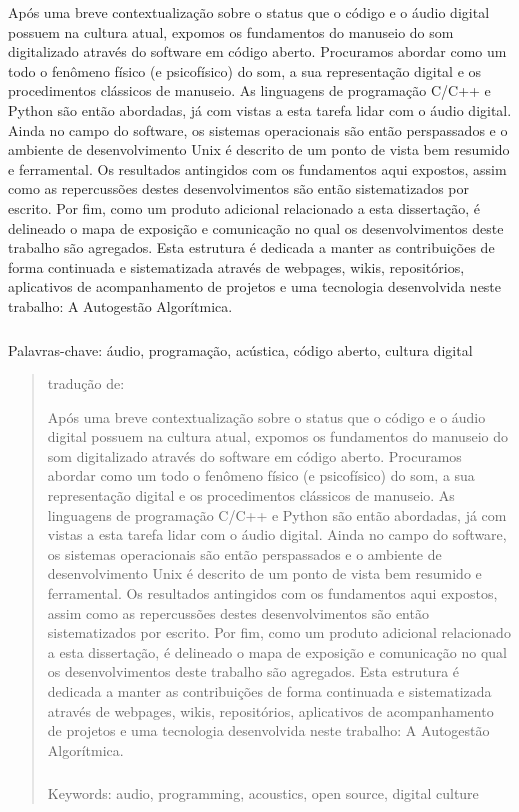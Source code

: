 \begin{resumo}

Após uma breve contextualização sobre o status que o código e o áudio digital possuem na cultura atual,
expomos os fundamentos do manuseio do som digitalizado através do software em código aberto. Procuramos abordar como um todo o fenômeno
físico (e psicofísico) do som, a sua representação digital e os procedimentos clássicos de manuseio. As linguagens de programação C/C++ e Python
são então abordadas, já com vistas a esta tarefa lidar com o áudio digital. Ainda no campo do software,
os sistemas operacionais são então perspassados e o ambiente de desenvolvimento Unix é descrito de um ponto
de vista bem resumido e ferramental. Os resultados antingidos com os fundamentos aqui expostos,
assim como as repercussões destes desenvolvimentos são então sistematizados por escrito. 
Por fim, como um produto adicional relacionado a esta dissertação, é delineado o mapa de exposição e comunicação no qual
os desenvolvimentos deste trabalho são agregados. Esta estrutura é dedicada a manter as contribuições
de forma continuada e sistematizada através de webpages, wikis, repositórios, aplicativos de acompanhamento de projetos
e uma tecnologia desenvolvida neste trabalho: A Autogestão Algorítmica.


$\phantom{linha em branco}$\\
Palavras-chave: áudio, programação, acústica, código aberto, cultura digital

\end{resumo}

\begin{abstract}

tradução de:

Após uma breve contextualização sobre o status que o código e o áudio digital possuem na cultura atual,
expomos os fundamentos do manuseio do som digitalizado através do software em código aberto. Procuramos abordar como um todo o fenômeno
físico (e psicofísico) do som, a sua representação digital e os procedimentos clássicos de manuseio. As linguagens de programação C/C++ e Python
são então abordadas, já com vistas a esta tarefa lidar com o áudio digital. Ainda no campo do software,
os sistemas operacionais são então perspassados e o ambiente de desenvolvimento Unix é descrito de um ponto
de vista bem resumido e ferramental. Os resultados antingidos com os fundamentos aqui expostos,
assim como as repercussões destes desenvolvimentos são então sistematizados por escrito. 
Por fim, como um produto adicional relacionado a esta dissertação, é delineado o mapa de exposição e comunicação no qual
os desenvolvimentos deste trabalho são agregados. Esta estrutura é dedicada a manter as contribuições
de forma continuada e sistematizada através de webpages, wikis, repositórios, aplicativos de acompanhamento de projetos
e uma tecnologia desenvolvida neste trabalho: A Autogestão Algorítmica.


$\phantom{linha em branco}$\\
Keywords: audio, programming, acoustics, open source, digital culture

\end{abstract}